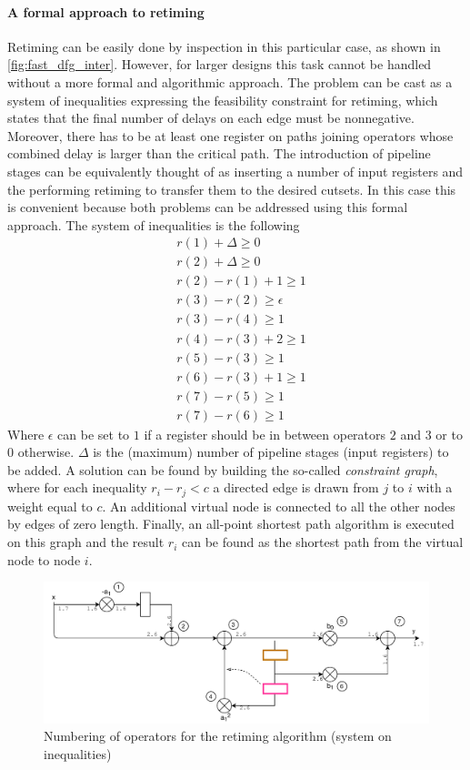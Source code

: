 \paragraph{A formal approach to retiming} Retiming can be easily done by inspection in this particular case, as shown in \autoref{fig:fast_dfg_inter}. However, for larger designs this task cannot be handled without a more formal and algorithmic approach. The problem can be cast as a system of inequalities expressing the feasibility constraint for retiming, which states that the final number of delays on each edge must be nonnegative. Moreover, there has to be at least one register on paths joining operators whose combined delay is larger than the critical path. The introduction of pipeline stages can be equivalently thought of as inserting a number of input registers and the performing retiming to transfer them to the desired cutsets. In this case this is convenient because both problems can be addressed using this formal approach. The system of inequalities is the following
\begin{align*}
&r(1) + \Delta \geq 0\\
&r(2)+\Delta \geq 0\\
&r(2)-r(1)+1\geq 1\\
&r(3)-r(2)\geq \epsilon\\
&r(3)-r(4) \geq 1\\
&r(4)-r(3)+2 \geq 1\\
&r(5)-r(3)\geq 1\\
&r(6)-r(3)+1\geq 1\\
&r(7)-r(5)\geq 1\\
&r(7)-r(6)\geq 1
\end{align*}
Where $\epsilon$ can be set to $1$ if a register should be in between operators $2$ and $3$ or to $0$ otherwise. $\Delta$ is the (maximum) number of pipeline stages (input registers) to be added.
A solution can be found by building the so-called \textit{constraint graph}, where for each inequality $r_i-r_j < c$  a directed edge is drawn from $j$ to $i$ with a weight equal to $c$. An additional virtual node is connected to all the other nodes by edges of zero length. Finally, an all-point shortest path algorithm is executed on this graph and the result $r_i$ can be found as the shortest path from the virtual node to node $i$.
\begin{figure}
	\includegraphics[width=\textwidth]{./chapter2/images/fastdfg_inter_index.pdf}
	\caption{Numbering of operators for the retiming algorithm (system on inequalities)}
\end{figure}
